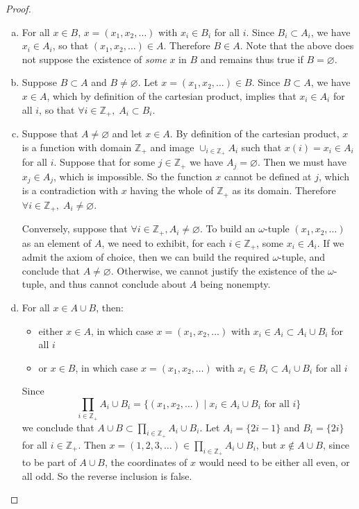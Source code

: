 \documentclass[11pt,a4paper,twoside]{article}
\theoremstyle{definition}
\begin{document}
\begin{proof}\hfill

  \begin{enumerate}[(a)]

  \item For all $x \in B$, $x = (x_1, x_2, \dotsc)$ with $x_i \in B_i$ for all $i$. Since $B_i \subset A_i$, we have
    $x_i \in A_i$, so that $(x_1, x_2, \dotsc) \in A$. Therefore $B \in A$.
    Note that the above does not suppose the existence of \emph{some} $x$ in $B$ and remains thus true if $B = \varnothing$.

  \item Suppose $B \subset A$ and $B \neq \varnothing$. Let $x = (x_1, x_2, \dotsc) \in B$. Since $B \subset A$, we have $x \in A$,
    which by definition of the cartesian product, implies that $x_i \in A_i$ for all $i$, so that $\forall i \in \mathbb{Z}_+, \; A_i \subset B_i$.

  \item Suppose that $A \neq \varnothing$ and let $x \in A$. By definition of the cartesian product, $x$ is a function with domain $\mathbb{Z}_+$
    and image $\cup_{i \in \mathbb{Z}_+} A_i$ such that $x (i) = x_i \in A_i$ for all $i$. Suppose that for some $j \in \mathbb{Z}_+$ we have $A_j = \varnothing$.
    Then we must have $x_j \in A_j$, which is impossible. So the function $x$ cannot be defined at $j$, which is a contradiction with $x$ having
    the whole of $\mathbb{Z}_+$ as its domain. Therefore $\forall i \in \mathbb{Z}_+, \; A_i \neq \varnothing$.

    Conversely, suppose that $\forall i \in \mathbb{Z}_+, A_i \neq \varnothing$. To build an $\omega$-tuple $(x_1, x_2, \dotsc)$ as an element of $A$,
    we need to exhibit, for each $i \in \mathbb{Z}_+$, some $x_i \in A_i$. If we admit the axiom of choice, then we can build the required $\omega$-tuple,
    and conclude that $A \neq \varnothing$.
    Otherwise, we cannot justify the existence of the $\omega$-tuple, and thus cannot conclude about $A$ being nonempty.

  \item For all $x \in A \cup B$, then:
    \begin{itemize}
    \item either $x \in A$, in which case $x = (x_1, x_2, \dotsc)$ with $x_i \in A_i \subset A_i \cup B_i$ for all $i$
    \item or $x \in B$, in which case $x = (x_1, x_2, \dotsc)$ with $x_i \in B_i \subset A_i \cup B_i$ for all $i$
    \end{itemize}
    Since
    \begin{equation*}
      \prod_{i \in \mathbb{Z}_+} A_i \cup B_i = \big\{ (x_1, x_2, \dotsc) \mid x_i \in A_i \cup B_i \text{ for all } i \big\}
    \end{equation*}
    we conclude that $A \cup B \subset \prod_{i \in \mathbb{Z}_+} A_i \cup B_i$.
    Let $A_i = \{ 2 i - 1 \}$ and $B_i = \{ 2 i \}$ for all $i \in \mathbb{Z}_+$. Then $x = (1, 2, 3, \dotsc) \in \prod_{i \in \mathbb{Z}_+} A_i \cup B_i$,
    but $x \notin A \cup B$, since to be part of $A \cup B$, the coordinates of $x$ would need to be either all even, or all odd.
    So the reverse inclusion is false.


\end{enumerate}
\end{proof}
\end{document}
